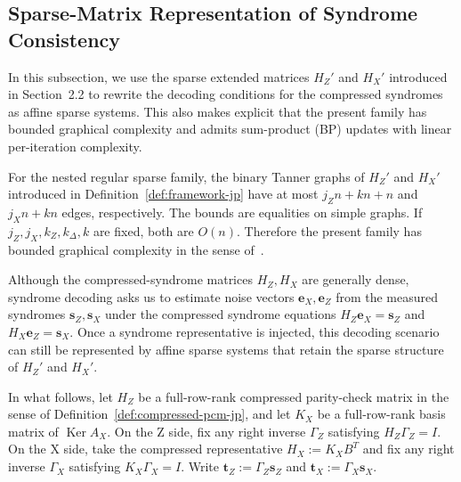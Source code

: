 \documentclass[11pt]{article}
\theoremstyle{definition}
\newcommand{\Ker}{\operatorname{Ker}}
\newcommand{\be}{\mathbf e}
\newcommand{\bs}{\mathbf s}
\newcommand{\bt}{\mathbf t}
\begin{document}
\subsection{Sparse-Matrix Representation of Syndrome Consistency}

In this subsection, we use the sparse extended matrices \(H_Z'\) and \(H_X'\) introduced in Section~2.2 to rewrite the decoding conditions for the compressed syndromes as affine sparse systems. This also makes explicit that the present family has bounded graphical complexity and admits sum-product (BP) updates with linear per-iteration complexity.

For the nested regular sparse family, the binary Tanner graphs of \(H_Z'\) and \(H_X'\) introduced in Definition~\ref{def:framework-jp} have at most \(j_Zn+kn+n\) and \(j_Xn+kn\) edges, respectively. The bounds are equalities on simple graphs. If \(j_Z,j_X,k_Z,k_\Delta,k\) are fixed, both are \(O(n)\). Therefore the present family has bounded graphical complexity in the sense of~\cite{HA05}.

Although the compressed-syndrome matrices \(H_Z,H_X\) are generally dense, syndrome decoding asks us to estimate noise vectors \(\be_X,\be_Z\) from the measured syndromes \(\bs_Z,\bs_X\) under the compressed syndrome equations \(H_Z\be_X=\bs_Z\) and \(H_X\be_Z=\bs_X\). Once a syndrome representative is injected, this decoding scenario can still be represented by affine sparse systems that retain the sparse structure of \(H_Z'\) and \(H_X'\).

In what follows, let \(H_Z\) be a full-row-rank compressed parity-check matrix in the sense of Definition~\ref{def:compressed-pcm-jp}, and let \(K_X\) be a full-row-rank basis matrix of \(\Ker A_X\). On the Z side, fix any right inverse \(\Gamma_Z\) satisfying \(H_Z\Gamma_Z=I\). On the X side, take the compressed representative \(H_X:=K_XB^T\) and fix any right inverse \(\Gamma_X\) satisfying \(K_X\Gamma_X=I\). Write \(\bt_Z:=\Gamma_Z\bs_Z\) and \(\bt_X:=\Gamma_X\bs_X\).
\end{document}
